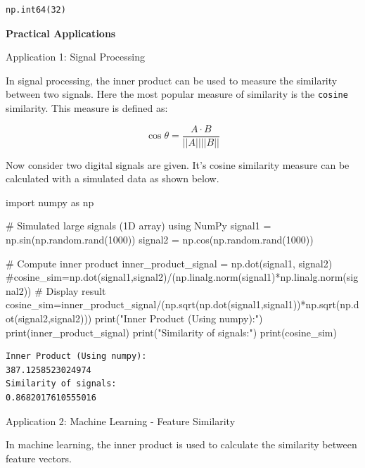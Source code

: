 \documentclass[
  letterpaper,
  DIV=11,
  numbers=noendperiod]{scrreprt}
\newenvironment{Shaded}{\begin{snugshade}}{\end{snugshade}}
\newcommand{\BuiltInTok}[1]{\textcolor[rgb]{0.00,0.23,0.31}{#1}}
\newcommand{\CommentTok}[1]{\textcolor[rgb]{0.37,0.37,0.37}{#1}}
\newcommand{\DecValTok}[1]{\textcolor[rgb]{0.68,0.00,0.00}{#1}}
\newcommand{\ImportTok}[1]{\textcolor[rgb]{0.00,0.46,0.62}{#1}}
\newcommand{\NormalTok}[1]{\textcolor[rgb]{0.00,0.23,0.31}{#1}}
\newcommand{\OperatorTok}[1]{\textcolor[rgb]{0.37,0.37,0.37}{#1}}
\newcommand{\StringTok}[1]{\textcolor[rgb]{0.13,0.47,0.30}{#1}}
\theoremstyle{plain}
\theoremstyle{definition}
\theoremstyle{remark}
\begin{document}
\begin{verbatim}
np.int64(32)
\end{verbatim}

\textbf{Practical Applications}

Application 1: Signal Processing

In signal processing, the inner product can be used to measure the
similarity between two signals. Here the most popular measure of
similarity is the \texttt{cosine} similarity. This measure is defined
as:

\[\cos \theta=\dfrac{A\cdot B}{||A|| ||B||}\]

Now consider two digital signals are given. It's cosine similarity
measure can be calculated with a simulated data as shown below.

\begin{Shaded}
\begin{Highlighting}[]
\ImportTok{import}\NormalTok{ numpy }\ImportTok{as}\NormalTok{ np}

\CommentTok{\# Simulated large signals (1D array) using NumPy}
\NormalTok{signal1 }\OperatorTok{=}\NormalTok{ np.sin(np.random.rand(}\DecValTok{1000}\NormalTok{))}
\NormalTok{signal2 }\OperatorTok{=}\NormalTok{ np.cos(np.random.rand(}\DecValTok{1000}\NormalTok{))}

\CommentTok{\# Compute inner product}
\NormalTok{inner\_product\_signal }\OperatorTok{=}\NormalTok{ np.dot(signal1, signal2)}
\CommentTok{\#cosine\_sim=np.dot(signal1,signal2)/(np.linalg.norm(signal1)*np.linalg.norm(signal2))}
\CommentTok{\# Display result}
\NormalTok{cosine\_sim}\OperatorTok{=}\NormalTok{inner\_product\_signal}\OperatorTok{/}\NormalTok{(np.sqrt(np.dot(signal1,signal1))}\OperatorTok{*}\NormalTok{np.sqrt(np.dot(signal2,signal2)))}
\BuiltInTok{print}\NormalTok{(}\StringTok{"Inner Product (Using numpy):"}\NormalTok{)}
\BuiltInTok{print}\NormalTok{(inner\_product\_signal)}
\BuiltInTok{print}\NormalTok{(}\StringTok{"Similarity of signals:"}\NormalTok{)}
\BuiltInTok{print}\NormalTok{(cosine\_sim)}
\end{Highlighting}
\end{Shaded}

\begin{verbatim}
Inner Product (Using numpy):
387.1258523024974
Similarity of signals:
0.8682017610555016
\end{verbatim}

Application 2: Machine Learning - Feature Similarity

In machine learning, the inner product is used to calculate the
similarity between feature vectors.
\end{document}
